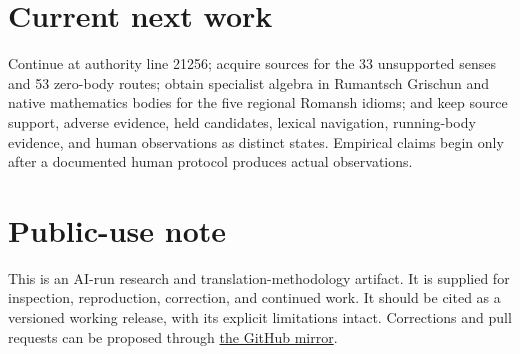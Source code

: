 \documentclass[10pt,a4paper]{article}
\begin{document}
\section*{Current next work}

Continue at authority line 21256; acquire sources for the 33 unsupported senses
and 53 zero-body routes; obtain specialist algebra in Rumantsch Grischun and
native mathematics bodies for the five regional Romansh idioms; and keep source
support, adverse evidence, held candidates, lexical navigation, running-body
evidence, and human observations as distinct states. Empirical claims begin only
after a documented human protocol produces actual observations.

\section*{Public-use note}

This is an AI-run research and translation-methodology artifact. It is supplied
for inspection, reproduction, correction, and continued work. It should be cited
as a versioned working release, with its explicit limitations intact. Corrections
and pull requests can be proposed through
\href{https://github.com/KokunoYumeto/modern-latex-manuscripts}{the GitHub mirror}.
\end{document}
